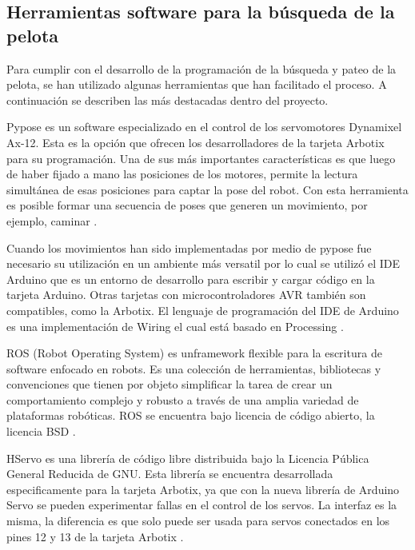 \subsection{Herramientas software para la b\'usqueda de la pelota } \label{subsection:Herrbusqueda}

Para cumplir con el desarrollo de la programación de la búsqueda y pateo de la pelota, se han utilizado algunas herramientas que han facilitado el proceso. A continuación se describen las más destacadas dentro del proyecto. 

Pypose \cite{pypose} es un software especializado en el control de los servomotores Dynamixel Ax-12. Esta es la opci\'on que ofrecen los desarrolladores de la tarjeta Arbotix para su programaci\'on. Una de sus más importantes características es que luego de haber fijado a mano las posiciones de los motores, permite la lectura simultánea de esas posiciones para captar la pose del robot. Con esta herramienta es posible formar una secuencia de poses que generen un movimiento, por ejemplo, caminar . 

Cuando los movimientos han sido implementadas por medio de pypose fue necesario su utilizaci\'on en un ambiente m\'as versatil por lo cual se utiliz\'o el IDE Arduino que es un entorno de desarrollo para escribir y cargar código en la tarjeta Arduino. Otras tarjetas con microcontroladores \gls{AVR} también son compatibles, como la Arbotix. El lenguaje de programación del IDE de Arduino es una implementación de Wiring el cual está basado en Processing \cite{arduino}.  

ROS (Robot Operating System) \cite{ros} es un\gls{framework} flexible para la escritura de software enfocado en robots. Es una colección de herramientas, bibliotecas y convenciones que tienen por objeto simplificar la tarea de crear un comportamiento complejo y robusto a través de una amplia variedad de plataformas robóticas. \gls{ROS} se encuentra bajo licencia de código abierto, la licencia \gls{BSD} .

HServo es una librería de código libre distribuida bajo la Licencia Pública General Reducida de GNU. Esta librería se encuentra desarrollada especificamente para la tarjeta Arbotix, ya que con la nueva librería de Arduino Servo se pueden experimentar fallas en el control de los servos. La interfaz es la misma, la diferencia es que solo puede ser usada para servos conectados en los pines 12 y 13 de la tarjeta Arbotix \cite{HServo}.    





